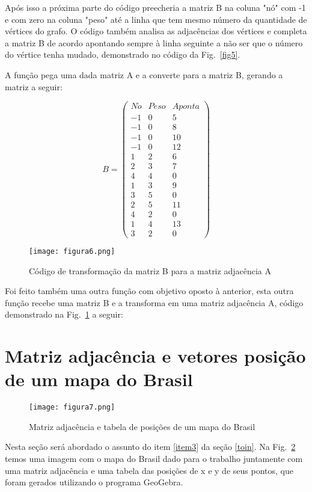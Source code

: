 Após isso a próxima parte do código preecheria a matriz B na coluna "nó" com -1  e com zero na coluna "peso" até a linha que tem mesmo número da quantidade de vértices do grafo. O código também analisa as adjacências dos vértices e completa a matriz B de acordo apontando sempre à linha seguinte a não ser que o número do vértice tenha mudado, demonstrado  no código da Fig.~\ref{fig5}.

A função pega uma dada matriz A e a converte para a matriz B, gerando a matriz a seguir:

\[B = 
\begin{pmatrix}
N\acute{o} & Peso & Aponta\\ 
-1 & 0 & 5\\ 
-1 & 0 & 8\\ 
-1 & 0 & 10\\ 
-1 & 0 & 12\\ 
1 & 2 & 6\\ 
2 & 3 & 7\\ 
4 & 4 & 0\\ 
1 & 3 & 9\\ 
3 & 5 & 0\\ 
2 & 5 & 11\\ 
4 & 2 & 0\\ 
1 & 4 & 13\\ 
3 & 2 & 0
\end{pmatrix}\]

\begin{figure}[!h]
\centering
\texttt{[image: figura6.png]}
%
\caption{Código de transformação da matriz B para a matriz adjacência A}
\label{fig6}
\end{figure}

Foi feito também uma outra função com objetivo oposto à anterior, esta outra função recebe uma matriz B e a transforma em uma matriz adjacência A, código demonstrado na Fig.~\ref{fig6} a seguir:

\section{Matriz adjacência e vetores posição de um mapa do Brasil} \label{mapaBrasil}
\begin{figure}[!h]
\centering
\texttt{[image: figura7.png]}
%
\caption{Matriz adjacência e tabela de posições de um mapa do Brasil}
\label{fig7}
\end{figure}

Nesta seção será abordado o assunto do item \ref{item3} da seção \ref{toin}. Na Fig.~\ref{fig7} temos uma imagem com o mapa do Brasil dado para o trabalho juntamente com uma matriz adjacência e uma tabela das posições de x e y de seus pontos, que foram gerados utilizando o programa GeoGebra.

